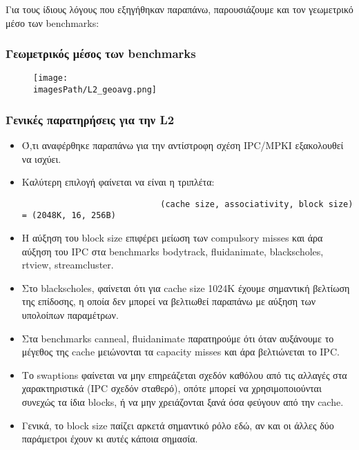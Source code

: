 \documentclass[12pt,a4paper]{article}
\newcommand{\imagesPath}{parsec-3.0/parsec_workspace/graphs}
\begin{document}
			Για τους ίδιους λόγους που εξηγήθηκαν παραπάνω, παρουσιάζουμε και τον γεωμετρικό μέσο των benchmarks:
			
			\subsubsection{Γεωμετρικός μέσος των benchmarks}
				\begin{figure}[H]
					\begin{center}
						\texttt{[image: \\imagesPath/L2\_geoavg.png]}
					\end{center}
				\end{figure}
				
			\subsubsection{Γενικές παρατηρήσεις για την L2}
				\begin{itemize}
					\item Ό,τι αναφέρθηκε παραπάνω για την αντίστροφη σχέση IPC/MPKI εξακολουθεί να ισχύει.
					\item Καλύτερη επιλογή φαίνεται να είναι η τριπλέτα:
					
						\begin{verbatim}
							(cache size, associativity, block size) = (2048K, 16, 256B)
						\end{verbatim}
					\item Η αύξηση του block size επιφέρει μείωση των compulsory misses και άρα αύξηση του IPC στα benchmarks bodytrack, fluidanimate, blackscholes, rtview, streamcluster.
					\item Στο blackscholes, φαίνεται ότι για cache size 1024K έχουμε σημαντική βελτίωση της επίδοσης, η οποία δεν μπορεί να βελτιωθεί παραπάνω με αύξηση των υπολοίπων παραμέτρων. 
					\item Στα benchmarks canneal, fluidanimate παρατηρούμε ότι όταν αυξάνουμε το μέγεθος της cache μειώνονται τα capacity misses και άρα βελτιώνεται το IPC.
					\item Το swaptions φαίνεται να μην επηρεάζεται σχεδόν καθόλου από τις αλλαγές στα χαρακτηριστικά (IPC σχεδόν σταθερό), οπότε μπορεί να χρησιμοποιούνται συνεχώς τα ίδια blocks, ή να μην χρειάζονται ξανά όσα φεύγουν από την cache.
					\item Γενικά, το block size παίζει αρκετά σημαντικό ρόλο εδώ, αν και οι άλλες δύο παράμετροι έχουν κι αυτές κάποια σημασία.
				\end{itemize}
		
\end{document}
